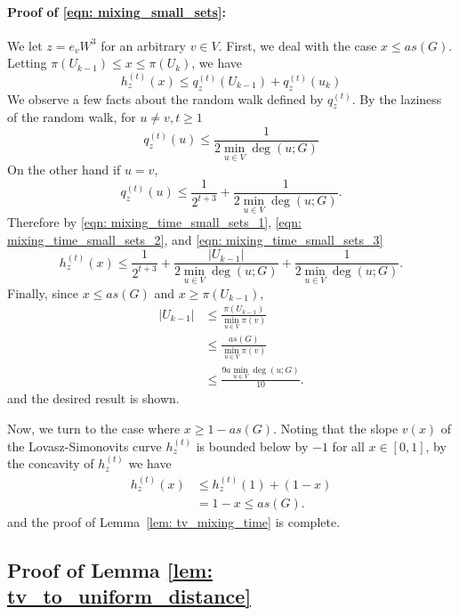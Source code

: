 \documentclass[11pt,twoside]{article}
\theoremstyle{definition}
\newcommand{\abs}[1]{\left \lvert #1 \right \rvert}
\newcommand{\1}{\mathbbm{1}}
\begin{document}
\paragraph{Proof of \eqref{eqn: mixing_small_sets}:}
We let $z = e_vW^3$ for an arbitrary $v \in V$. First, we deal with the case $x \leq as(G)$. Letting $\pi(U_{k-1}) \leq x \leq \pi(U_{k})$, we have
\begin{equation}
\label{eqn: mixing_time_small_sets_1}
h_z^{(t)}(x) \leq q_z^{(t)}(U_{k - 1}) + q_z^{(t)}(u_k)
\end{equation}
We observe a few facts about the random walk defined by $q_z^{(t)}$. By the laziness of the random walk, for $u \neq v, t \geq 1$
\begin{equation}
\label{eqn: mixing_time_small_sets_2}
q_z^{(t)}(u) \leq \frac{1}{2 \min_{u \in V}\deg(u;G)}
\end{equation}
On the other hand if $u = v$,
\begin{equation}
\label{eqn: mixing_time_small_sets_3}
q_z^{(t)}(u) \leq \frac{1}{2^{t + 3}} + \frac{1}{2\min_{u \in V}\deg(u;G)}.
\end{equation}
Therefore by \eqref{eqn: mixing_time_small_sets_1}, \eqref{eqn: mixing_time_small_sets_2}, and \eqref{eqn: mixing_time_small_sets_3}
\begin{equation*}
h_z^{(t)}(x) \leq \frac{1}{2^{t + 3}} + \frac{\abs{U_{k - 1}}}{2 \min_{u \in V}\deg(u;G)} + \frac{1}{2 \min_{u \in V}\deg(u;G)}.
\end{equation*}
Finally, since $x \leq a s(G)$ and $x \geq \pi(U_{k - 1})$,
\begin{align*}
\abs{U_{k - 1}} & \leq \frac{\pi(U_{k-1})}{\min_{u \in V} \pi(v) } \\
& \leq \frac{as(G)}{\min_{u \in V} \pi(v) } \\
& \leq \frac{9a\min_{u \in V}\deg(u;G)}{10}.
\end{align*}
and the desired result is shown.

Now, we turn to the case where $x \geq 1 - as(G)$. Noting that the slope $v(x)$ of the Lovasz-Simonovits curve $h_z^{(t)}$ is bounded below by $-1$ for all $x \in [0,1]$, by the concavity of $h_z^{(t)}$ we have
\begin{align*}
h_z^{(t)}(x) & \leq h_z^{(t)}(1) + (1 - x) \\
& = 1 - x \leq as(G).
\end{align*}
and the proof of Lemma~\ref{lem: tv_mixing_time} is complete.

\subsection{Proof of Lemma \ref{lem: tv_to_uniform_distance}}
\end{document}
